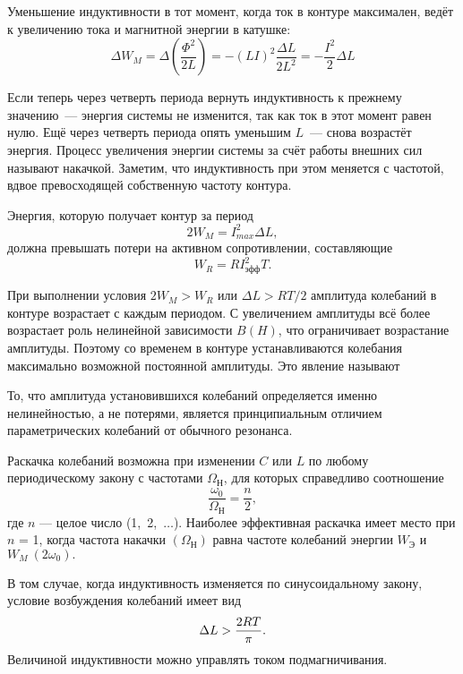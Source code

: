 Уменьшение индуктивности в тот момент, когда ток в контуре максимален, ведёт к
увеличению тока и магнитной энергии в катушке:
\begin{equation*}
	\Delta W_M = \Delta \left(\frac{\Phi^2}{2L}\right) = - (LI)^2\frac{\Delta
L}{2L^2} = - \frac{I^2}{2}\Delta L
\end{equation*}

Если теперь через четверть периода вернуть индуктивность к прежнему значению~---
энергия системы не изменится, так как ток в этот момент равен нулю. Ещё через
четверть периода опять уменьшим $L$~--- снова возрастёт энергия. Процесс
увеличения энергии системы за счёт работы внешних сил называют накачкой.
Заметим, что индуктивность при этом меняется с частотой, вдвое превосходящей
собственную частоту контура.

Энергия, которую получает контур за период
\begin{equation*}
	2W_M = I^2_{max} \Delta L,
\end{equation*}
должна превышать потери на активном сопротивлении, составляющие
\begin{equation*}
	W_R = RI^2_\text{эфф}T.
\end{equation*}

При выполнении условия $2W_M > W_R$ или $\Delta L > RT/2$ амплитуда колебаний в
контуре возрастает с каждым периодом. С увеличением амплитуды всё более
возрастает роль нелинейной зависимости $B(H)$, что ограничивает возрастание
амплитуды. Поэтому со временем в контуре устанавливаются колебания максимально
возможной постоянной амплитуды. Это явление называют 

То, что амплитуда установившихся колебаний определяется именно нелинейностью, а
не потерями, является принципиальным отличием параметрических колебаний от
обычного резонанса.

Раскачка колебаний возможна при изменении $C$ или $L$ по любому периодическому
закону с частотами $\Omega_\text{Н}$, для которых справедливо соотношение
\begin{equation*}
	\frac{\omega_0}{\Omega_\text{Н}} = \frac{n}{2},
\end{equation*}
где $n$ --- целое число (1,~2,~$\dots$). Наиболее эффективная раскачка имеет
место при $n$ = 1, когда частота накачки $(\Omega_\text{Н})$ равна частоте
колебаний энергии $W_\text{Э}$ и $W_M~(2\omega_0).$

 В том случае, когда индуктивность изменяется по синусоидальному закону, условие
возбуждения колебаний имеет вид
\begin{equation}
	\eqmark{4.6.3}
	\Delta L > \frac{2RT}{\pi}.
\end{equation}
Величиной индуктивности можно управлять током подмагничивания.

